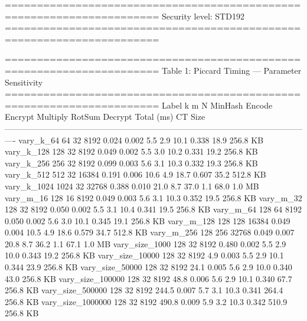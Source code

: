======================================================================
  Security level: STD192
======================================================================

======================================================================
  Table 1: Piccard Timing — Parameter Sensitivity
======================================================================
              Label     k    m      N  MinHash  Encode  Encrypt  Multiply  RotSum  Decrypt  Total (ms)   CT Size
----------------------------------------------------------------------------------------------------------------
          vary_k_64    64   32   8192    0.024   0.002      5.5       2.9    10.1    0.338        18.9  256.8 KB
         vary_k_128   128   32   8192    0.049   0.002      5.5       3.0    10.2    0.331        19.2  256.8 KB
         vary_k_256   256   32   8192    0.099   0.003      5.6       3.1    10.3    0.332        19.3  256.8 KB
         vary_k_512   512   32  16384    0.191   0.006     10.6       4.9    18.7    0.607        35.2  512.8 KB
        vary_k_1024  1024   32  32768    0.388   0.010     21.0       8.7    37.0      1.1        68.0    1.0 MB
          vary_m_16   128   16   8192    0.049   0.003      5.6       3.1    10.3    0.352        19.5  256.8 KB
          vary_m_32   128   32   8192    0.050   0.002      5.5       3.1    10.4    0.341        19.5  256.8 KB
          vary_m_64   128   64   8192    0.050   0.002      5.6       3.0    10.1    0.345        19.1  256.8 KB
         vary_m_128   128  128  16384    0.049   0.004     10.5       4.9    18.6    0.579        34.7  512.8 KB
         vary_m_256   128  256  32768    0.049   0.007     20.8       8.7    36.2      1.1        67.1    1.0 MB
     vary_size_1000   128   32   8192    0.480   0.002      5.5       2.9    10.0    0.343        19.2  256.8 KB
    vary_size_10000   128   32   8192      4.9   0.003      5.5       2.9    10.1    0.344        23.9  256.8 KB
    vary_size_50000   128   32   8192     24.1   0.005      5.6       2.9    10.0    0.340        43.0  256.8 KB
   vary_size_100000   128   32   8192     48.8   0.006      5.6       2.9    10.1    0.340        67.7  256.8 KB
   vary_size_500000   128   32   8192    244.5   0.007      5.7       3.1    10.3    0.341       264.4  256.8 KB
  vary_size_1000000   128   32   8192    490.8   0.009      5.9       3.2    10.3    0.342       510.9  256.8 KB


